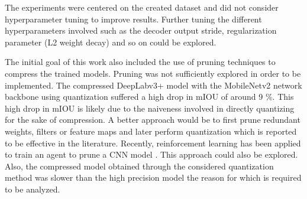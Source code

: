 The experiments were centered on the created dataset and did not consider hyperparameter tuning to improve results. Further tuning the different hyperparameters involved such as the decoder output stride, regularization parameter (L2 weight decay) and so on could be explored. 

The initial goal of this work also included the use of pruning techniques to compress the trained models. Pruning was not sufficiently explored in order to be implemented. The compressed DeepLabv3+ model with the MobileNetv2 network backbone using quantization suffered a high drop in mIOU of around 9 \%. This high drop in mIOU is likely due to the naiveness involved in directly quantizing for the sake of compression. A better approach would be to first prune redundant weights, filters or feature maps and later perform quantization which is reported to be effective in the literature. Recently, reinforcement learning has been applied to train an agent to prune a CNN model \cite{DBLP:journals/corr/abs-1801-07365}. This approach could also be explored. Also, the compressed model obtained through the considered quantization method was slower than the high precision model the reason for which is required to be analyzed.

